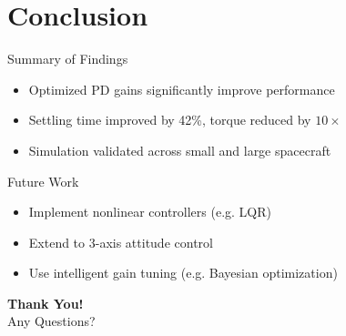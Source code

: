 \documentclass{beamer}
\begin{document}
\section{Conclusion}

\begin{frame}{Summary of Findings}
\begin{itemize}
  \item Optimized PD gains significantly improve performance
  \item Settling time improved by 42\%, torque reduced by $10\times$
  \item Simulation validated across small and large spacecraft
\end{itemize}
\end{frame}

\begin{frame}{Future Work}
\begin{itemize}
  \item Implement nonlinear controllers (e.g. LQR)
  \item Extend to 3-axis attitude control
  \item Use intelligent gain tuning (e.g. Bayesian optimization)
\end{itemize}
\end{frame}

\begin{frame}
  \centering
  \Huge\textbf{Thank You!} \\
  \vspace{0.5cm}
  \Large Any Questions?
\end{frame}
\end{document}
